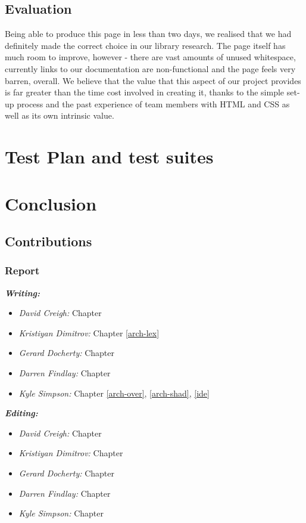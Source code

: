 \documentclass{l3proj}
\begin{document}
\section{Evaluation}
\label{ide-eval}
Being able to produce this page in less than two days, we realised that we had definitely made the correct choice in our library research. The page itself has much room to improve, however - there are vast amounts of unused whitespace, currently links to our documentation are non-functional and the page feels very barren, overall. We believe that the value that this aspect of our project provides is far greater than the time cost involved in creating it, thanks to the simple set-up process and the past experience of team members with HTML and CSS as well as its own intrinsic value.
\chapter{Test Plan and test suites}
\label{test}

\chapter{Conclusion}
\label{conc}

\section{Contributions}
\label{cont}

\subsection{Report}
\label{cont-report}

\textit{\textbf{Writing:}}
\begin{itemize}
\item \emph{David Creigh:} Chapter
\item \emph{Kristiyan Dimitrov:} Chapter \ref{arch-lex}
\item \emph{Gerard Docherty:} Chapter 
\item \emph{Darren Findlay:} Chapter 
\item \emph{Kyle Simpson:} Chapter \ref{arch-over}, \ref{arch-shad}, \ref{ide}
\end{itemize}
\textit{\textbf{Editing:}}
\begin{itemize}
\item \emph{David Creigh:} Chapter 
\item \emph{Kristiyan Dimitrov:} Chapter 
\item \emph{Gerard Docherty:} Chapter 
\item \emph{Darren Findlay:} Chapter 
\item \emph{Kyle Simpson:} Chapter 
\end{itemize}
\end{document}
